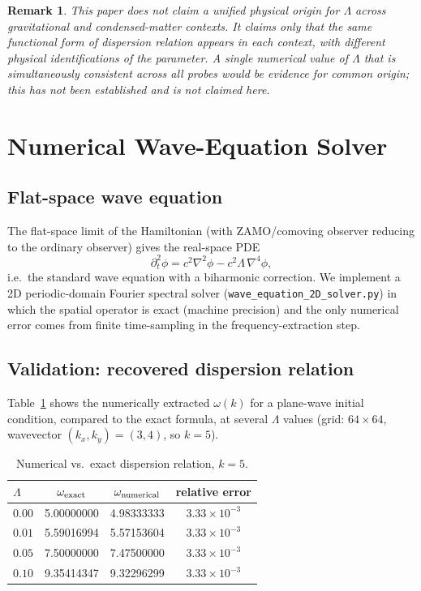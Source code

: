 \documentclass[12pt,a4paper]{article}
\newtheorem{remark}{Remark}
\begin{document}
\begin{remark}
This paper does not claim a unified physical origin for $\Lambda$ across
gravitational and condensed-matter contexts. It claims only that the
\emph{same functional form} of dispersion relation appears in each
context, with different physical identifications of the parameter. A
single numerical value of $\Lambda$ that is simultaneously consistent
across all probes would be evidence for common origin; this has not been
established and is not claimed here.
\end{remark}

\section{Numerical Wave-Equation Solver}
\label{sec:solver}

\subsection{Flat-space wave equation}

The flat-space limit of the Hamiltonian (with ZAMO/comoving observer
reducing to the ordinary observer) gives the real-space PDE
\begin{equation}\label{eq:pde}
  \partial_t^2\phi = c^2\nabla^2\phi - c^2\Lambda\,\nabla^4\phi,
\end{equation}
i.e.\ the standard wave equation with a biharmonic correction. We
implement a 2D periodic-domain Fourier spectral solver
(\texttt{wave\_equation\_2D\_solver.py}) in which the spatial operator
is exact (machine precision) and the only numerical error comes from
finite time-sampling in the frequency-extraction step.

\subsection{Validation: recovered dispersion relation}

Table~\ref{tab:dispersion_test} shows the numerically extracted
$\omega(k)$ for a plane-wave initial condition, compared to the exact
formula, at several $\Lambda$ values (grid: $64\times64$, wavevector
$(k_x,k_y)=(3,4)$, so $k=5$).

\begin{table}[h]
\centering
\caption{Numerical vs.\ exact dispersion relation, $k=5$.}
\label{tab:dispersion_test}
\begin{tabular}{lccc}
\toprule
$\Lambda$ & $\omega_{\rm exact}$ & $\omega_{\rm numerical}$ & relative error \\
\midrule
$0.00$ & 5.00000000 & 4.98333333 & $3.33\times10^{-3}$ \\
$0.01$ & 5.59016994 & 5.57153604 & $3.33\times10^{-3}$ \\
$0.05$ & 7.50000000 & 7.47500000 & $3.33\times10^{-3}$ \\
$0.10$ & 9.35414347 & 9.32296299 & $3.33\times10^{-3}$ \\
\bottomrule
\end{tabular}
\end{table}
\end{document}
